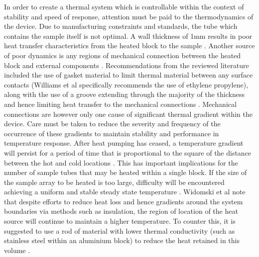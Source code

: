 
In order to create a thermal system which is controllable within the context of stability and speed of response, attention must be paid to the thermodynamics of the device. Due to manufacturing constraints and standards, the tube which contains the sample itself is not optimal. A wall thickness of 1mm results in poor heat transfer characteristics from the heated block to the sample \cite{1704922}. Another source of poor dynamics is any regions of mechanical connection between the heated block and external components \cite{7238517}. Recommendations from the reviewed literature included the use of gasket material to limit thermal material between any surface contacts (Williams et al specifically recommends the use of ethylene propylene), along with the use of a groove extending through the majority of the thickness and hence limiting heat transfer to the mechanical connections \cite{20130415930883}\cite{20070113880}. Mechanical connections are however only one cause of significant thermal gradient within the device. Care must be taken to reduce the severity and frequency of the occurrence of these gradients to maintain stability and performance in temperature response. After heat pumping has ceased, a temperature gradient will persist for a period of time that is proportional to the square of the distance between the hot and cold locations \cite{7238517}. This has important implications for the number of sample tubes that may be heated within a single block. If the size of the sample array to be heated is too large, difficulty will be encountered achieving a uniform and stable steady state temperature \cite{7238517}. Widomski et al note that despite efforts to reduce heat loss and hence gradients around the system boundaries via methods such as insulation, the region of location of the heat source will continue to maintain a higher temperature. To counter this, it is suggested to use a rod of material with lower thermal conductivity (such as stainless steel within an aluminium block) to reduce the heat retained in this volume \cite{20070113880}.\\

